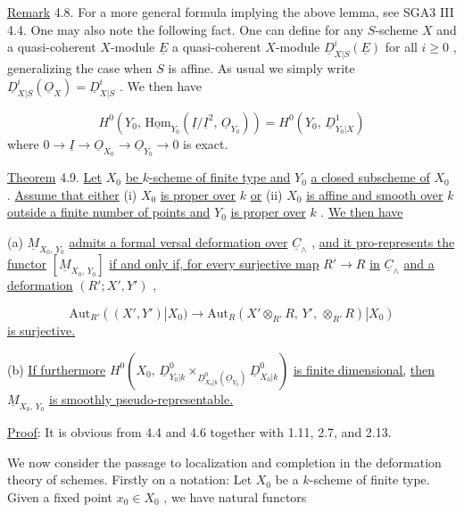 \underline{Remark} 4.8.  For a more general formula implying the above lemma, see SGA3 III 4.4. One may also note the following fact. One can define for any $S$-scheme $X$ and a quasi-coherent $X$-module $\underline{E}$ a quasi-coherent $X$-module $\underline{D}^i_{X|S}(\underline{E})$ for all $i \geq 0$ , generalizing the case when $S$ is affine. As usual we simply write $\underline{D}^i_{X|S}(\underline{O}_X) = \underline{D}^i_{X|S}$ . We then have

\begin{equation*}
H^0(Y_0,\, \underline{\mathrm{Hom}}_{Y_0}(\underline{I}/\underline{I}^2,\, \underline{O}_{Y_0})) = H^0(Y_0,\, \underline{D}^1_{Y_0|X})
\end{equation*}
where $0 \to \underline{I} \to \underline{O}_{X_0} \to \underline{O}_{Y_0} \to 0$ is exact.

\underline{Theorem} 4.9.  \underline{Let} $X_0$ \underline{be $k$-scheme of finite type and} $Y_0$ \underline{a closed subscheme of} $X_0$ . \underline{Assume that either} (i) $X_0$ \underline{is proper over} $k$ \underline{or} (ii) $X_0$ \underline{is affine and smooth over} $k$ \underline{outside a finite number of points and} $Y_0$ \underline{is proper over} $k$ . \underline{We then have}

(a) $\underline{M}_{X_0,\,Y_0}$ \underline{admits a formal versal deformation over} $\underline{C}_\wedge$ , \underline{and it pro-represents the functor} $[\underline{M}_{X_0,\,Y_0}]$ \underline{if and only if, for every surjective map} $R' \to R$ \underline{in} $\underline{C}_\wedge$ \underline{and a deformation} $(R'; X', Y')$ ,

\begin{equation*}
\mathrm{Aut}_{R'}((X', Y')|X_0) \to \mathrm{Aut}_R(X' \otimes_{R'} R,\, Y',\, \otimes_{R'} R)|X_0)
\end{equation*}
\underline{is surjective.}

(b) \underline{If furthermore} $H^0(X_0,\, \underline{D}^0_{Y_0|k} \times_{\underline{D}^0_{X_0|k}(\underline{O}_{Y_0})} \underline{D}^0_{X_0|k})$ \underline{is finite dimensional,} \underline{then} $\underline{M}_{X_0,\,Y_0}$ \underline{is smoothly pseudo-representable.}

\underline{Proof}: It is obvious from 4.4 and 4.6 together with 1.11, 2.7, and 2.13.

We now consider the passage to localization and completion in the deformation theory     of schemes. Firstly on a notation: Let $X_0$ be a $k$-scheme of finite type. Given a fixed point $x_0 \in X_0$ , we have natural functors

